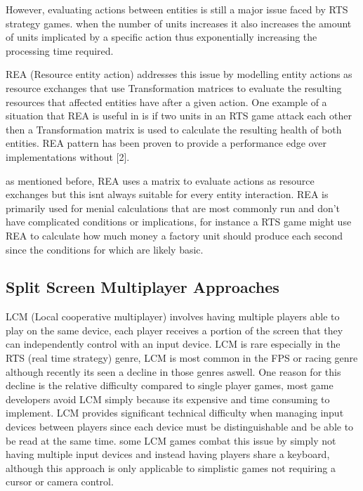 \documentclass[]{final_report}
\begin{document}
However, evaluating actions between entities is still a major issue faced by RTS strategy games. when the number of units increases it also increases the amount of units implicated by a specific action thus exponentially increasing the processing time required.  \newline

 REA (Resource entity action) addresses this issue by modelling entity actions as resource exchanges that use Transformation matrices to evaluate the resulting resources that affected entities have after a given action. One example of a situation that REA is useful in is if two units in an RTS game attack each other then a Transformation matrix is used to calculate the resulting health of both entities. REA pattern has been proven to provide a performance edge over implementations without [2]. \newline
 
 as mentioned before, REA uses a matrix to evaluate actions as resource exchanges but this isnt always suitable for every entity interaction. REA is primarily used for menial calculations that are most commonly run and don't have complicated conditions or implications, for instance a RTS game might use REA to calculate how much money a factory unit should produce each second since the conditions for which are likely basic. \newline
 
 

\subsection{Split Screen Multiplayer Approaches }

LCM (Local cooperative multiplayer) involves having multiple players able to play on the same device, each player receives a portion of the screen that they can independently control with an input device. LCM is rare especially in the RTS (real time strategy) genre, LCM is most common in the FPS or racing genre although recently its seen a decline in those genres aswell. One reason for this decline is the relative difficulty compared to single player games, most game developers avoid LCM simply because its expensive and time consuming to implement. \newline
LCM provides significant technical difficulty when managing input devices between players since each device must be distinguishable and be able to be read at the same time. some LCM games combat this issue by simply not having multiple input devices and instead having players share a keyboard, although this approach is only applicable to simplistic games not requiring a cursor or camera control. \newline
\end{document}
